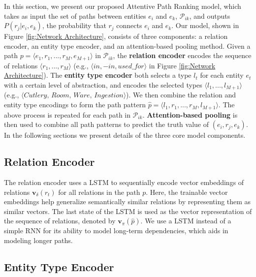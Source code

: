 \documentclass[letterpaper]{article} %
\begin{document}
In this section, we present our proposed Attentive Path Ranking model, which takes as input the set of paths between entities $e_i$ and $e_k$, $\mathcal{P}_{ik}$, and outputs $P(r_j|e_i, e_k)$, the probability that $r_j$ connects $e_i$ and $e_k$. Our model, shown in Figure \ref{fig:Network Architecture}, consists of three components: a relation encoder, an entity type encoder, and an attention-based pooling method. Given a path $p = \langle e_1,r_1,...,r_M,e_{M+1}\rangle$ in $\mathcal{P}_{ik}$, the \textbf{relation encoder} encodes the sequence of relations $\langle r_1,...,r_M\rangle$ (e.g., $\langle in, -in, used\_for \rangle$ in Figure \ref{fig:Network Architecture}). The \textbf{entity type encoder} both selects a type $l_t$ for each entity $e_t$ with a certain level of abstraction, and encodes the selected types $\langle l_1,...,l_{M+1} \rangle$ (e.g., $\langle Cutlery,\, Room,\, Ware,\, Ingestion \rangle$). We then combine the relation and entity type encodings to form the path pattern $\hat{p} = \langle l_1,r_1,...,r_M,l_{M+1}\rangle$. The above process is repeated for each path in $\mathcal{P}_{ik}$. \textbf{Attention-based pooling} is then used to combine all path patterns to predict the truth value of $(e_i, r_j, e_k)$. 
In the following sections we present details of the three core model components.

\subsection{Relation Encoder}

The relation encoder uses a LSTM \cite{lstm} to sequentially encode vector embeddings of relations $\bm{v}_\delta(r_t)$ for all relations in the path $p$. Here, the trainable vector embeddings help generalize semantically similar relations by representing them as similar vectors. The last state of the LSTM is used as the vector representation of the sequence of relations, denoted by $\bm{v}_\pi(\hat{p})$. We use a LSTM instead of a simple RNN for its ability to model long-term dependencies, which aids in modeling longer paths.

\subsection{Entity Type Encoder}
\end{document}

